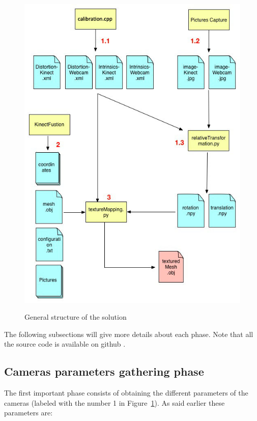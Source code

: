 \begin{figure}
\caption{General structure of the solution}
\centering
    \includegraphics[width=1.0\textwidth]{images/workflow.jpg}
\label{fig:workflow}
\end{figure}

The following subsections will give more details about each phase. Note that all the source code is available on github \cite{github}.

\subsection{Cameras parameters gathering phase}
\label{sec:Cameras parameters gathering phase} 
The first important phase consists of obtaining the different parameters of the cameras (labeled with the number 1 in Figure~\ref{fig:workflow}). As said earlier these parameters are:\\

